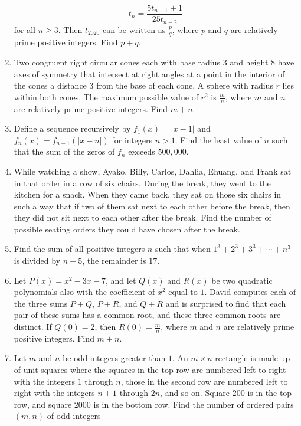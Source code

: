 \documentclass{article}
\begin{document}
\begin{enumerate}[label=\arabic*., itemsep=0.5em]
\begin{equation*}
t_n = \frac{5t_{n-1}+1}{25t_{n-2}}
\end{equation*}
for all \(n \ge 3\). Then \(t_{2020}\) can be written as \(\frac{p}{q}\), where \(p\) and \(q\) are relatively prime positive integers. Find \(p+q\).\par \vspace{0.5em}\item Two congruent right circular cones each with base radius \(3\) and height \(8\) have axes of symmetry that intersect at right angles at a point in the interior of the cones a distance \(3\) from the base of each cone. A sphere with radius \(r\) lies within both cones. The maximum possible value of \(r^2\) is \(\frac{m}{n}\), where \(m\) and \(n\) are relatively prime positive integers. Find \(m+n\).\par \vspace{0.5em}\item Define a sequence recursively by \(f_1(x)=|x-1|\) and \(f_n(x)=f_{n-1}(|x-n|)\) for integers \(n>1\). Find the least value of \(n\) such that the sum of the zeros of \(f_n\) exceeds \(500,000\).\par \vspace{0.5em}\item While watching a show, Ayako, Billy, Carlos, Dahlia, Ehuang, and Frank sat in that order in a row of six chairs. During the break, they went to the kitchen for a snack. When they came back, they sat on those six chairs in such a way that if two of them sat next to each other before the break, then they did not sit next to each other after the break. Find the number of possible seating orders they could have chosen after the break.\par \vspace{0.5em}\item Find the sum of all positive integers \(n\) such that when \(1^3+2^3+3^3+\cdots +n^3\) is divided by \(n+5\), the remainder is \(17\).\par \vspace{0.5em}\item Let \(P(x) = x^2 - 3x - 7\), and let \(Q(x)\) and \(R(x)\) be two quadratic polynomials also with the coefficient of \(x^2\) equal to \(1\). David computes each of the three sums \(P + Q\), \(P + R\), and \(Q + R\) and is surprised to find that each pair of these sums has a common root, and these three common roots are distinct. If \(Q(0) = 2\), then \(R(0) = \frac{m}{n}\), where \(m\) and \(n\) are relatively prime positive integers. Find \(m + n\).\par \vspace{0.5em}\item Let \(m\) and \(n\) be odd integers greater than \(1.\) An \(m\times n\) rectangle is made up of unit squares where the squares in the top row are numbered left to right with the integers \(1\) through \(n\), those in the second row are numbered left to right with the integers \(n + 1\) through \(2n\), and so on. Square \(200\) is in the top row, and square \(2000\) is in the bottom row. Find the number of ordered pairs \((m,n)\) of odd integers 
\end{enumerate}
\end{document}
